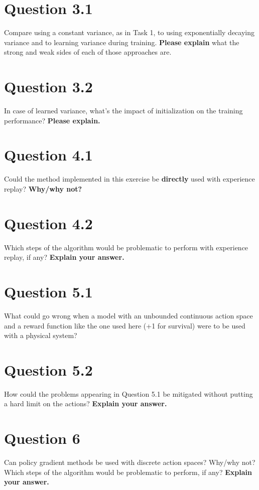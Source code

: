 \documentclass[12pt]{article}
\begin{document}
\section*{Question 3.1}

Compare using a constant variance, as in Task 1, to using exponentially decaying variance and to learning variance during training. \textbf{Please explain} what the strong and weak sides of each of those approaches are.

\section*{Question 3.2}

In case of learned variance, what’s the impact of initialization on the
training performance? \textbf{Please explain.}

\section*{Question 4.1}

Could the method implemented in this exercise be \textbf{directly} used
with experience replay? \textbf{Why/why not?}

\section*{Question 4.2}

Which steps of the algorithm would be problematic to perform with
experience replay, if any? \textbf{Explain your answer.}


\section*{Question 5.1}

What could go wrong when a model with an unbounded continuous
action space and a reward function like the one used here (+1 for survival) were to be used with
a physical system?


\section*{Question 5.2}

How could the problems appearing in Question 5.1 be mitigated
without putting a hard limit on the actions? \textbf{Explain your answer.}

\section*{Question 6}

Can policy gradient methods be used with discrete action spaces?
Why/why not? Which steps of the algorithm would be problematic to perform, 
if any? \textbf{Explain your answer.}

















\end{document}
